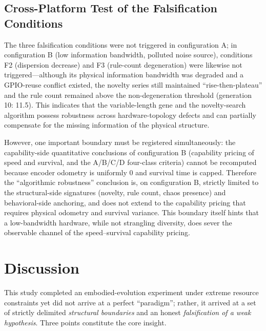 \documentclass[11pt]{article}
\begin{document}
\subsection{Cross-Platform Test of the Falsification Conditions}
The three falsification conditions were not triggered in configuration A; in configuration B (low information bandwidth, polluted noise source), conditions F2 (dispersion decrease) and F3 (rule-count degeneration) were likewise not triggered---although its physical information bandwidth was degraded and a GPIO-reuse conflict existed, the novelty series still maintained ``rise-then-plateau'' and the rule count remained above the non-degeneration threshold (generation 10: 11.5). This indicates that the variable-length gene and the novelty-search algorithm possess robustness across hardware-topology defects and can partially compensate for the missing information of the physical structure.

However, one important boundary must be registered simultaneously: the capability-side quantitative conclusions of configuration B (capability pricing of speed and survival, and the A/B/C/D four-class criteria) cannot be recomputed because encoder odometry is uniformly 0 and survival time is capped. Therefore the ``algorithmic robustness'' conclusion is, on configuration B, strictly limited to the structural-side signatures (novelty, rule count, chaos presence) and behavioral-side anchoring, and does not extend to the capability pricing that requires physical odometry and survival variance. This boundary itself hints that a low-bandwidth hardware, while not strangling diversity, does sever the observable channel of the speed--survival capability pricing.

\section{Discussion}
\label{sec:discussion}

This study completed an embodied-evolution experiment under extreme resource constraints yet did not arrive at a perfect ``paradigm''; rather, it arrived at a set of strictly delimited \emph{structural boundaries} and an honest \emph{falsification of a weak hypothesis}. Three points constitute the core insight.
\end{document}
